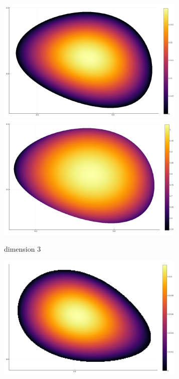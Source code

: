 \documentclass[10pt,a4paper]{report}
\theoremstyle{plain}
\theoremstyle{definition}
\theoremstyle{remark}
\begin{document}
\begin{figure}
\begin{subfigure}[t]{0.49\textwidth}
  \end{subfigure}
  \begin{subfigure}[t]{0.49\textwidth}
    \includegraphics[width=0.99\textwidth]{det3b.png}
    \includegraphics[width=0.99\textwidth]{ent3b.png}
    \caption{dimension 3}
  \end{subfigure}
  \begin{subfigure}[t]{0.49\textwidth}
    \includegraphics[width=0.99\textwidth]{det4.png}

\end{subfigure}
\end{figure}
\end{document}
